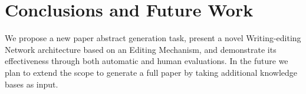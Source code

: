 \documentclass[11pt,a4paper]{article}
\begin{document}
 \section{Conclusions and Future Work}

We propose a new paper abstract generation task, present a novel Writing-editing Network architecture based on an Editing Mechanism, and demonstrate its effectiveness through both automatic and human evaluations. In the future we plan to extend the scope to generate a full paper by taking additional knowledge bases as input.




%
 




























\appendix
\end{document}
